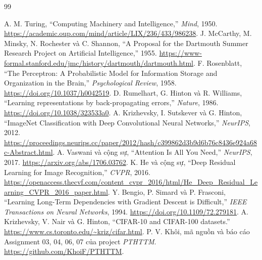 \documentclass[12pt,a4paper]{report}
\begin{document}
\clearpage
\begin{thebibliography}{99}
 A. M. Turing, ``Computing Machinery and Intelligence,'' \textit{Mind}, 1950. \url{https://academic.oup.com/mind/article/LIX/236/433/986238}.
 J. McCarthy, M. Minsky, N. Rochester và C. Shannon, ``A Proposal for the Dartmouth Summer Research Project on Artificial Intelligence,'' 1955. \url{https://www-formal.stanford.edu/jmc/history/dartmouth/dartmouth.html}.
 F. Rosenblatt, ``The Perceptron: A Probabilistic Model for Information Storage and Organization in the Brain,'' \textit{Psychological Review}, 1958. \url{https://doi.org/10.1037/h0042519}.
 D. Rumelhart, G. Hinton và R. Williams, ``Learning representations by back-propagating errors,'' \textit{Nature}, 1986. \url{https://doi.org/10.1038/323533a0}.
 A. Krizhevsky, I. Sutskever và G. Hinton, ``ImageNet Classification with Deep Convolutional Neural Networks,'' \textit{NeurIPS}, 2012. \url{https://proceedings.neurips.cc/paper/2012/hash/c399862d3b9d6b76c8436e924a68c-Abstract.html}.
 A. Vaswani và cộng sự, ``Attention Is All You Need,'' \textit{NeurIPS}, 2017. \url{https://arxiv.org/abs/1706.03762}.
 K. He và cộng sự, ``Deep Residual Learning for Image Recognition,'' \textit{CVPR}, 2016. \url{https://openaccess.thecvf.com/content_cvpr_2016/html/He_Deep_Residual_Learning_CVPR_2016_paper.html}.
 Y. Bengio, P. Simard và P. Frasconi, ``Learning Long-Term Dependencies with Gradient Descent is Difficult,'' \textit{IEEE Transactions on Neural Networks}, 1994. \url{https://doi.org/10.1109/72.279181}.
 A. Krizhevsky, V. Nair và G. Hinton, ``CIFAR-10 and CIFAR-100 datasets.'' \url{https://www.cs.toronto.edu/~kriz/cifar.html}.
 P. V. Khôi, mã nguồn và báo cáo Assignment 03, 04, 06, 07 của project \textit{PTHTTM}. \url{https://github.com/KhoiF/PTHTTM}.


\end{thebibliography}
\end{document}
